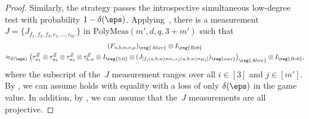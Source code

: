 \begin{proof}
Similarly, the strategy passes the introspective simultaneous low-degree test with probability $1-\delta(\eps)$.
Applying~, there is a measurement $J = \{J_{f_1, f_2, f_3, c_1, \ldots, c_{m'}}\}$ in $\mathrm{PolyMeas}(m',d, q, 3+m')$ such that
\begin{multline}\label{eq:whatevs-tres}
(F_{u, b, w, \nu, \mu})_{\reg{Alice}} \otimes I_{\reg{Bob}}\\
\approx_{\delta(\eps)}
\left(\tau^Z_{u_1} \otimes \tau^Z_{u_2} \otimes \tau^Z_{u_3} \otimes \tau^Z_{b, w}
	\otimes I_{\reg{5,6}} \otimes (J_{[f_i(u, b, w) = \nu_i, c_j(u, b, w) = \mu_j]})_{\reg{aux}}\right)_{\reg{Alice}} \otimes I_{\reg{Bob}},
\end{multline}
where the subscript of the~$J$ measurement ranges over all $i \in [3]$ and $j \in [m']$.
By , we can assume  holds with equality
with a loss of only $\delta(\eps)$ in the game value.
In addition, by , we can assume that the~$J$ measurements are all projective.


\end{proof}
